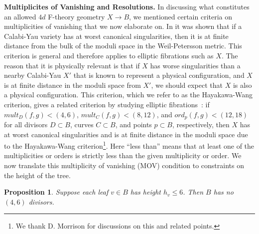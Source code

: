 \documentclass[aps,prl,twocolumn, superscriptaddress,groupedaddress,nofootinbib]{revtex4-1}
\newtheorem{prop}{Proposition}
\newcommand{\XXX}[3]{}
\begin{document}
\vspace{.2cm}
\noindent \textbf{Multiplicites of Vanishing and Resolutions.}
In discussing what constitutes an allowed $4d$ F-theory geometry $X\to B$, we mentioned
certain criteria on multiplicities of vanishing that we now elaborate on. In 
\cite{Hayakawa,Wang} it was shown that if a Calabi-Yau variety has at worst
canonical singularities, then it is at finite distance 
from the bulk of the moduli space in the Weil-Petersson metric. 
This criterion is general and therefore applies to elliptic fibrations such as $X$.
The reason that it is physically relevant is that if $X$ has worse singularities
than a nearby Calabi-Yau $X'$ that is known to represent a physical configuration,
and $X$ is at finite distance in the moduli space from $X'$, we should expect that
$X$ is also a physical configuration. This criterion, which we refer to as the
Hayakawa-Wang criterion, gives a related criterion by studying elliptic
fibrations~\cite{Grassi1991, Candelas:2000nc, Morrisonunp}:
if $mult_D (f,g) < (4,6)$, $mult_C(f,g) < (8,12)$, and $ord_p(f,g) < (12,18)$ 
for all divisors $D\subset B$, curves $C\subset B$, and points $p\subset B$, respectively,
then  $X$ has at worst
canonical singularities and is at finite distance in the
moduli space due to the Hayakawa-Wang criterion\footnote{We thank D. Morrison for discussions on
this and related points.}. Here ``less than'' means that at least one of the multiplicities or orders is strictly less than the given multiplicity or order. %
 We now translate this multiplicity of vanishing (MOV) condition to constraints on the height of the tree.%
\begin{prop}
\label{prop:heightcrit}
Suppose each leaf $v\in B$ has height $h_v\leq 6$. Then $B$ has
no $(4,6)$ divisors.
\end{prop}
\end{document}

